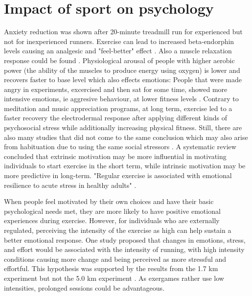 \chapter{Impact of sport on psychology}
Anxiety reduction was shown after 20-minute treadmill run for experienced but not for inexperienced runners. \cite{hatfield87psychophysiology, boutcher86anxiety}
Exercise can lead to increased beta-endorphin levels causing an analgesic and "feel-better" effect \cite{hatfield87psychophysiology}. Also a muscle relaxation response could be found \cite{devries72electromyiographic, hatfield87psychophysiology}.
Physiological arousal of people with higher aerobic power (the ability of the muscles to produce energy using oxygen) is lower and recovers faster to base level which also effects emotions: People that were made angry in experiments, excercised and then sat for some time, showed more intensive emotions, ie aggresive behaviour, at lower fitness levels \cite{zillmann74attribution}.
Contrary to meditation and music appreciation programs, at long term, exercise led to a faster recovery the electrodermal response after applying different kinds of psychosocial stress \cite{keller84physical} while additionally increasing physical fitness. Still, there are also many studies that did not come to the same conclusion which may also arise from habituation due to using the same social stressors \cite{hatfield87psychophysiology}.
A systematic review concluded that extrinsic motivation may be more influential in motivating individuals to start exercise in the short term, while intrinsic motivation may be more predictive in long-term.\cite{teixeira2012exercise} 
"Regular exercise is associated with emotional resilience to acute stress in healthy adults" \cite{childs15regular}.

When people feel motivated by their own choices and have their basic psychological needs met, they are more likely to have positive emotional experiences during exercise. However, for individuals who are externally regulated, perceiving the intensity of the exercise as high can help sustain a better emotional response. \cite{teixeira16needs}
One study proposed that changes in emotions, stress, and effort would be associated with the intensity of running, with high intensity conditions causing more change and being perceived as more stressful and effortful. This hypothesis was supported by the results from the 1.7 km experiment but not the 5.0 km experiment \cite{kerr2000effects}. As exergames rather use low intensities, prolonged sessions could be advantageous. 

